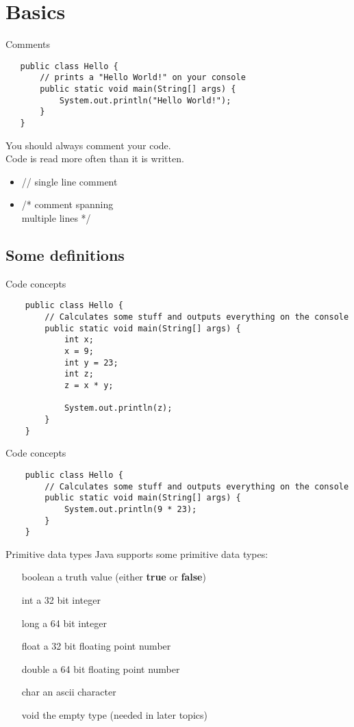 \section{Basics}

\begin{frame}[fragile]{Comments}
   \begin{lstlisting}
   public class Hello {
       // prints a "Hello World!" on your console
       public static void main(String[] args) {
           System.out.println("Hello World!");
       }
   }
   \end{lstlisting}
   You should always comment your code. \\
   Code is read more often than it is written.
   \begin{itemize}
       \item // single line comment
       \item /* comment spanning \\
           multiple lines */
   \end{itemize}
\end{frame}

\subsection{Some definitions}

\begin{frame}[fragile]{Code concepts}
	\begin{lstlisting}
	public class Hello {
	    // Calculates some stuff and outputs everything on the console
	    public static void main(String[] args) {	        
	        int x;
	        x = 9;
	        int y = 23;
	        int z;
	        z = x * y;
	        
	        System.out.println(z);
	    }
	}
	\end{lstlisting}
\end{frame}

\begin{frame}[fragile]{Code concepts}
	\begin{lstlisting}
	public class Hello {
	    // Calculates some stuff and outputs everything on the console
	    public static void main(String[] args) {
	        System.out.println(9 * 23);
	    }
	}
	\end{lstlisting}
\end{frame}

\begin{frame}{Primitive data types}
	Java supports some primitive data types:
	\begin{itemize}
		\item[boolean] a truth value (either \textbf{true} or \textbf{false})
		\item[int] a 32 bit integer
		\item[long] a 64 bit integer
		\item[float] a 32 bit floating point number
		\item[double] a 64 bit floating point number
		\item[char] an ascii character
		\item[void] the empty type (needed in later topics)
	\end{itemize}
\end{frame}

